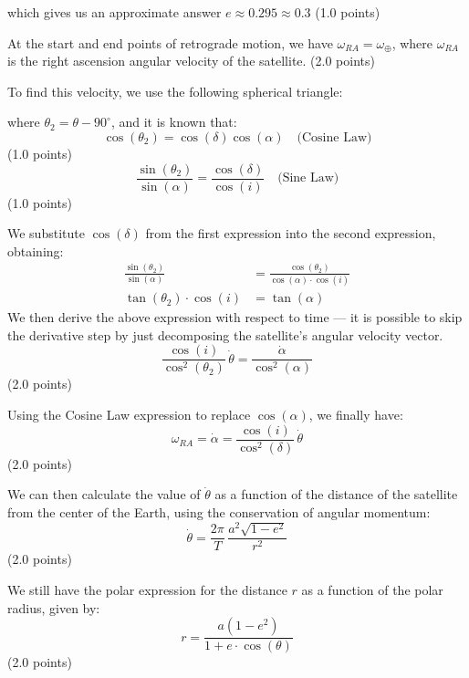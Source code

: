 \begin{description}
  which gives us an approximate answer $\boxed{e \approx 0.295 \approx 0.3}$
  \hfill(1.0 points)

\item[(i)] At the start and end points of retrograde motion, we have
  $\omega_{RA} = \omega_\oplus$, where $\omega_{RA}$ is the right ascension
  angular velocity of the satellite. \hfill(2.0 points)

  To find this velocity, we use the following spherical triangle:


  where $\theta_2 = \theta - 90^\circ$, and it is known that:
  \[
    \cos(\theta_2) = \cos(\delta)\cos(\alpha) \quad\text{(Cosine Law)}
  \]
  \hfill(1.0 points)
  \[
    \frac{\sin(\theta_2)}{\sin(\alpha)} = \frac{\cos(\delta)}{\cos(i)}
    \quad\text{(Sine Law)}
  \]
  \hfill(1.0 points)

  We substitute $\cos(\delta)$ from the first expression into the second
  expression, obtaining:
  \begin{align*}
    \frac{\sin(\theta_2)}{\sin(\alpha)}
      &= \frac{\cos(\theta_2)}{\cos(\alpha)\cdot\cos(i)} \\
    \tan(\theta_2)\cdot\cos(i) &= \tan(\alpha)
  \end{align*}
  We then derive the above expression with respect to time --- it is possible
  to skip the derivative step by just decomposing the satellite's angular
  velocity vector.
  \[
    \frac{\cos(i)}{\cos^2(\theta_2)}\,\dot\theta
      = \frac{\dot\alpha}{\cos^2(\alpha)}
  \]
  \hfill(2.0 points)

  Using the Cosine Law expression to replace $\cos(\alpha)$, we finally have:
  \[
    \omega_{RA} = \dot\alpha = \frac{\cos(i)}{\cos^2(\delta)}\,\dot\theta
  \]
  \hfill(2.0 points)

  We can then calculate the value of $\dot\theta$ as a function of the
  distance of the satellite from the center of the Earth, using the
  conservation of angular momentum:
  \[
    \dot\theta = \frac{2\pi}{T}\,\frac{a^2\sqrt{1 - e^2}}{r^2}
  \]
  \hfill(2.0 points)

  We still have the polar expression for the distance $r$ as a function of the
  polar radius, given by: %
  \[
    r = \frac{a(1 - e^2)}{1 + e\cdot\cos(\theta)}
  \]
  \hfill(2.0 points)


\end{description}
